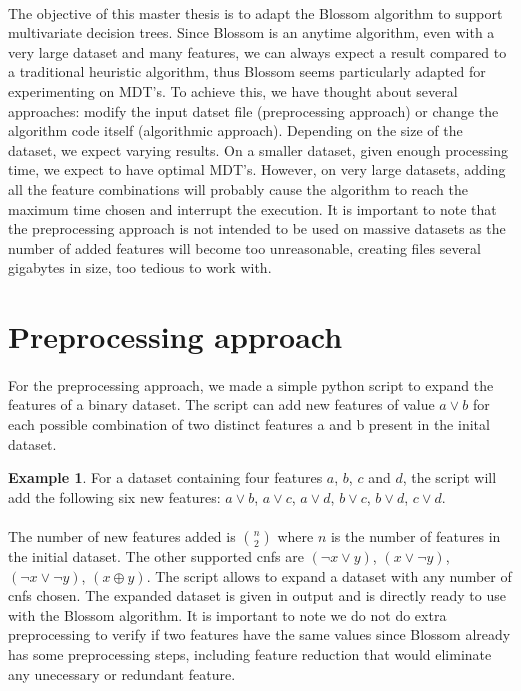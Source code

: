 \documentclass[12pt]{report}
\theoremstyle{definition}
\newtheorem*{example}{Example}
\theoremstyle{definition}
\theoremstyle{definition}
\begin{document}
\paragraph{} The objective of this master thesis is to adapt the Blossom algorithm to support multivariate
decision trees. Since Blossom is an anytime algorithm, even with a very large dataset and many features,
we can always expect a result compared to a traditional heuristic algorithm, thus Blossom seems particularly
adapted for experimenting on MDT's. To achieve this, we have thought about several approaches: modify the
input datset file (preprocessing approach) or change the algorithm code itself (algorithmic approach).
Depending on the size of the dataset, we expect varying results. On a smaller dataset, given enough
processing time, we expect to have optimal MDT's. However, on very large datasets, adding all the feature
combinations will probably cause the algorithm to reach the maximum time chosen and interrupt the execution.
It is important to note that the preprocessing approach is not intended to be used on massive datasets as
the number of added features will become too unreasonable, creating files several gigabytes in size,
too tedious to work with. 

\section{Preprocessing approach}
\paragraph{} For the preprocessing approach, we made a simple python script to expand the features of a binary
dataset. The script can add new features of value $a \lor b$ for each possible combination of two distinct
features a and b present in the inital dataset.

\begin{example}
    For a dataset containing four features $a$, $b$, $c$ and $d$, the script will add the following six new
    features: $a \lor b$, $a \lor c$, $a \lor d$, $b \lor c$, $b \lor d$, $c \lor d$.
\end{example}

\paragraph{} The number of new features added is $n \choose 2$ where $n$ is the number of features in
the initial dataset. The other supported cnfs are $(\neg x \lor y)$, $(x \lor \neg y)$, $(\neg x \lor \neg y)$, 
$(x \oplus y)$. The script allows to expand a dataset with any number of cnfs chosen. The expanded
dataset is given in output and is directly ready to use with the Blossom algorithm. It is important to note
we do not do extra preprocessing to verify if two features have the same values since Blossom already has
some preprocessing steps, including feature reduction that would eliminate any unecessary or redundant feature.
\end{document}
